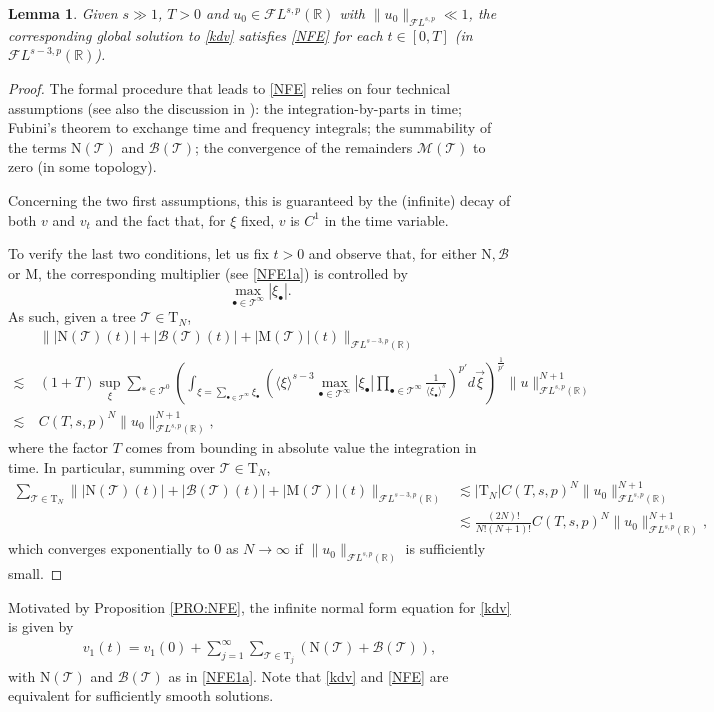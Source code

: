 \documentclass[%
11pt,  reqno]{amsart}
\newcommand{\jap}[1]{\langle #1 \rangle}
\newcommand{\5}{\textup{V}}
\newtheorem{lemma}[theorem]{Lemma}
\theoremstyle{remark}
\newcommand{\R}{\mathbb{R}}
\newcommand{\bul}{\bullet}
\newcommand{\TT}{\mathcal{T}}
\newcommand{\Tr}{\mathrm{T}}
\newcommand{\B}{\mathcal{B}}
\numberwithin{equation}{section}
\numberwithin{theorem}{section}
\newcommand{\MM}{\mathrm{M}}
\newcommand{\NN}{\mathrm{N}}
\begin{document}
{
\color{blue}


\begin{lemma}
	Given $s\gg 1$, $T>0$ and $u_0\in \mathcal{F}L^{s,p}(\R)$ with $\|u_0\|_{\mathcal{F}L^{s,p}}\ll 1$, the corresponding global solution to \eqref{kdv} satisfies \eqref{NFE} for each $t\in [0,T]$ (in $\mathcal{F}L^{s-3,p}(\R)$). 
\end{lemma}
\begin{proof}
	The formal procedure that leads to \eqref{NFE} relies on four technical assumptions (see also the discussion in \cite[PÁGINA]{KOY}): the integration-by-parts in time; Fubini's theorem to exchange time and frequency integrals; the summability of the terms $\NN(\TT)$ and $\B(\TT)$; the convergence of the remainders $\mathcal{M}(\TT)$ to zero (in some topology).
	
	Concerning the two first assumptions, this is guaranteed by the (infinite) decay of both $v$ and $v_t$ and the fact that, for $\xi$ fixed, $v$ is $C^1$ in the time variable.
	
	To verify the last two conditions, let us fix $t>0$ and observe that, for either $\NN, \B$ or $\MM$, the corresponding multiplier (see \eqref{NFE1a}) is controlled by 
	$$\max_{\bul\in \TT^\infty}|\xi_\bul|.
	$$ As such, given a tree $\TT\in \Tr_N$,
	\begin{align*}
	&\||\NN(\TT)(t)| + |\B(\TT)(t)| + |\MM(\TT)|(t)\|_{\mathcal{F}L^{s-3,p}(\R)}\\\lesssim\ & (1+T)\sup_\xi\sum_{\ast \in \TT^0} \left( \int_{\xi=\sum_{\bul\in\TT^\infty}\xi_\bul} \left({\jap{\xi}^{s-3}\max_{\bul\in \TT^\infty}|\xi_\bul|}\prod_{{\bul\in \TT^\infty}} \frac{1}{\jap{\xi_\bul}^{s}}\right)^{p'} d\vec{\xi} \right)^{\frac{1}{p'}}\|u\|_{\mathcal{F}L^{s,p}(\R)}^{N+1}\\\lesssim\ & C(T,s,p)^N\|u_0\|_{\mathcal{F}L^{s,p}(\R)}^{N+1},
	\end{align*}
	where the factor $T$ comes from bounding in absolute value the integration in time. In particular, summing over $\TT\in \Tr_N$,
\begin{align*}
		\sum_{\TT\in \Tr_N} \||\NN(\TT)(t)| + |\B(\TT)(t)| + |\MM(\TT)|(t)\|_{\mathcal{F}L^{s-3,p}(\R)} &\lesssim |\Tr_N|C(T,s,p)^N\|u_0\|_{\mathcal{F}L^{s,p}(\R)}^{N+1}\\&\lesssim \frac{(2N)!}{N!(N+1)!}C(T,s,p)^N\|u_0\|_{\mathcal{F}L^{s,p}(\R)}^{N+1},
\end{align*}
	which converges exponentially to 0 as $N\to \infty$ if $\|u_0\|_{\mathcal{F}L^{s,p}(\R)}$ is sufficiently small.
\end{proof}




Motivated by Proposition \ref{PRO:NFE}, the infinite normal form equation for
\eqref{kdv} is given by
\begin{align}
\label{NFE}
v_1(t)=v_1(0) + \sum_{j=1}^{\infty} \sum_{\TT\in \Tr_j} \left(\NN(\TT) +
\B(\TT) \right)
,
\end{align}
with $\NN(\TT)$ and $\B(\TT)$ as in \eqref{NFE1a}.
Note that \eqref{kdv} and \eqref{NFE} are equivalent for sufficiently smooth solutions.



}
\end{document}
